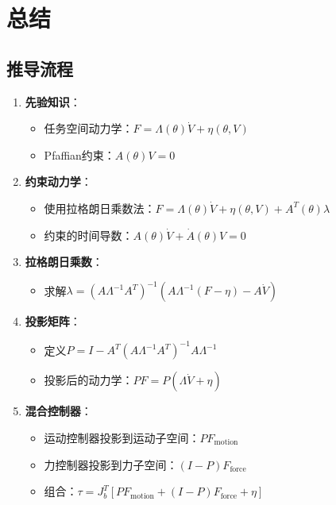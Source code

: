 \documentclass[12pt,a4paper]{article}
\begin{document}
\section{总结}

\subsection{推导流程}

\begin{enumerate}
\item \textbf{先验知识}：
\begin{itemize}
\item 任务空间动力学：$F = \Lambda(\theta)\dot{V} + \eta(\theta, V)$
\item Pfaffian约束：$A(\theta)V = 0$
\end{itemize}

\item \textbf{约束动力学}：
\begin{itemize}
\item 使用拉格朗日乘数法：$F = \Lambda(\theta)\dot{V} + \eta(\theta, V) + A^T(\theta)\lambda$
\item 约束的时间导数：$A(\theta)\dot{V} + \dot{A}(\theta)V = 0$
\end{itemize}

\item \textbf{拉格朗日乘数}：
\begin{itemize}
\item 求解$\lambda = (A\Lambda^{-1}A^T)^{-1}(A\Lambda^{-1}(F - \eta) - A\dot{V})$
\end{itemize}

\item \textbf{投影矩阵}：
\begin{itemize}
\item 定义$P = I - A^T(A\Lambda^{-1}A^T)^{-1}A\Lambda^{-1}$
\item 投影后的动力学：$PF = P(\Lambda\dot{V} + \eta)$
\end{itemize}

\item \textbf{混合控制器}：
\begin{itemize}
\item 运动控制器投影到运动子空间：$PF_{\text{motion}}$
\item 力控制器投影到力子空间：$(I-P)F_{\text{force}}$
\item 组合：$\tau = J_b^T[PF_{\text{motion}} + (I-P)F_{\text{force}} + \eta]$
\end{itemize}
\end{enumerate}
\end{document}
